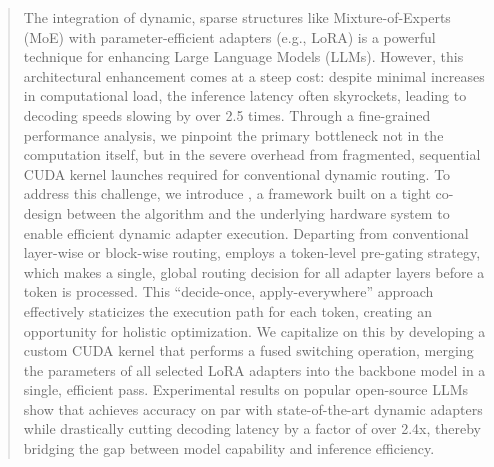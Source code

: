 \begin{abstract}
The integration of dynamic, sparse structures like Mixture-of-Experts (MoE) with parameter-efficient adapters (e.g., LoRA) is a powerful technique for enhancing Large Language Models (LLMs). However, this architectural enhancement comes at a steep cost: despite minimal increases in computational load, the inference latency often skyrockets, leading to decoding speeds slowing by over 2.5 times. Through a fine-grained performance analysis, we pinpoint the primary bottleneck not in the computation itself, but in the severe overhead from fragmented, sequential CUDA kernel launches required for conventional dynamic routing.
% 
To address this challenge, we introduce \sys, a framework built on a tight co-design between the algorithm and the underlying hardware system to enable efficient dynamic adapter execution. Departing from conventional layer-wise or block-wise routing, \sys employs a token-level pre-gating strategy, which makes a single, global routing decision for all adapter layers before a token is processed. This ``decide-once, apply-everywhere'' approach effectively staticizes the execution path for each token, creating an opportunity for holistic optimization. We capitalize on this by developing a custom CUDA kernel that performs a fused switching operation, merging the parameters of all selected LoRA adapters into the backbone model in a single, efficient pass. Experimental results on popular open-source LLMs show that \sys achieves accuracy on par with state-of-the-art dynamic adapters while drastically cutting decoding latency by a factor of over 2.4x, thereby bridging the gap between model capability and inference efficiency.
\end{abstract}